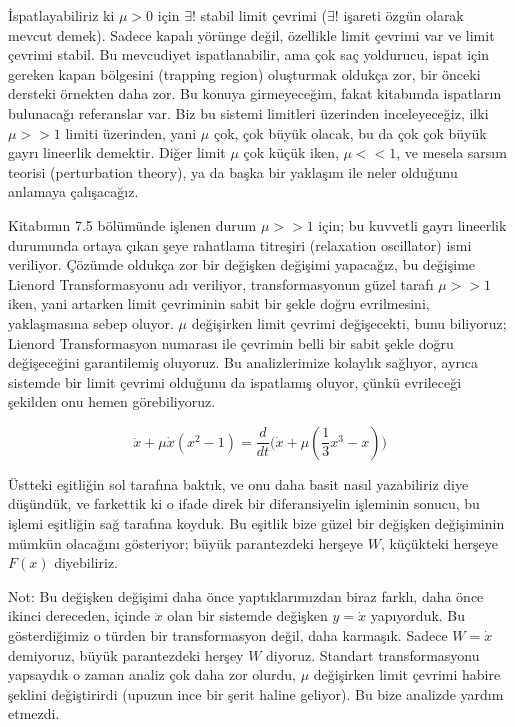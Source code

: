 \documentclass[12pt,fleqn]{article}\usepackage{../../common}
\begin{document}
İspatlayabiliriz ki $\mu > 0$ için $\exists !$ stabil limit çevrimi
($\exists !$ işareti özgün olarak mevcut demek). Sadece kapalı yörünge
değil, özellikle limit çevrimi var ve limit çevrimi stabil. Bu mevcudiyet
ispatlanabilir, ama çok saç yoldurucu, ispat için gereken kapan bölgesini
(trapping region) oluşturmak oldukça zor, bir önceki dersteki örnekten daha
zor. Bu konuya girmeyeceğim, fakat kitabımda ispatların bulunacağı
referanslar var. Biz bu sistemi limitleri üzerinden inceleyeceğiz, ilki
$\mu >> 1$ limiti üzerinden, yani $\mu$ çok, çok büyük olacak, bu da çok
çok büyük gayrı lineerlik demektir. Diğer limit $\mu$ çok küçük iken,
$\mu << 1$, ve mesela sarsım teorisi (perturbation theory), ya da başka bir
yaklaşım ile neler olduğunu anlamaya çalışacağız.

Kitabımın 7.5 bölümünde işlenen durum $\mu >> 1$ için; bu kuvvetli gayrı
lineerlik durumunda ortaya çıkan şeye rahatlama titreşiri (relaxation
oscillator) ismi veriliyor. Çözümde oldukça zor bir değişken değişimi yapacağız,
bu değişime Lienord Transformasyonu adı veriliyor, transformasyonun güzel tarafı
$\mu >> 1$ iken, yani artarken limit çevriminin sabit bir şekle doğru
evrilmesini, yaklaşmasına sebep oluyor. $\mu$ değişirken limit çevrimi
değişecekti, bunu biliyoruz; Lienord Transformasyon numarası ile çevrimin belli
bir sabit şekle doğru değişeceğini garantilemiş oluyoruz. Bu analizlerimize
kolaylık sağlıyor, ayrıca sistemde bir limit çevrimi olduğunu da ispatlamış
oluyor, çünkü evrileceği şekilden onu hemen görebiliyoruz.

$$ \ddot{x} + \mu \dot{x}(x^2-1) =
\frac{d}{dt} \big( \dot{x} + \mu (\frac{1}{3} x^3 - x) \big)
$$

Üstteki eşitliğin sol tarafına baktık, ve onu daha basit nasıl yazabiliriz diye
düşündük, ve farkettik ki o ifade direk bir diferansiyelin işleminin sonucu, bu
işlemi eşitliğin sağ tarafına koyduk. Bu eşitlik bize güzel bir değişken
değişiminin mümkün olacağını gösteriyor; büyük parantezdeki herşeye $W$,
küçükteki herşeye $F(x)$ diyebiliriz.

Not: Bu değişken değişimi daha önce yaptıklarımızdan biraz farklı, daha önce
ikinci dereceden, içinde $\ddot{x}$ olan bir sistemde değişken $y = \dot{x}$
yapıyorduk. Bu gösterdiğimiz o türden bir transformasyon değil, daha
karmaşık. Sadece $W=\dot{x}$ demiyoruz, büyük parantezdeki herşey $W$
diyoruz. Standart transformasyonu yapsaydık o zaman analiz çok daha zor olurdu,
$\mu$ değişirken limit çevrimi habire şeklini değiştirirdi (upuzun ince bir
şerit haline geliyor). Bu bize analizde yardım etmezdi.
\end{document}
